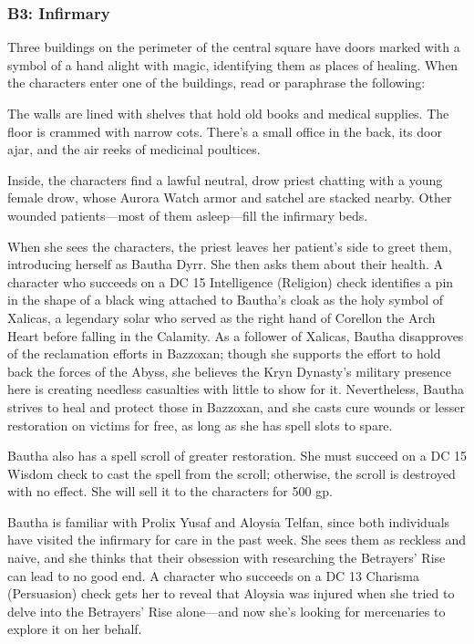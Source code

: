\documentclass[10pt,a4paper,twoside,twocolumn,openany,nodeprecatedcode]{dndbook}
\begin{document}
\subsubsection{B3: Infirmary}
Three buildings on the perimeter of the central square have doors marked with a symbol of a hand alight with magic, identifying them as places of healing. When the characters enter one of the buildings, read or paraphrase the following:

\begin{DndReadAloud}{}
The walls are lined with shelves that hold old books and medical supplies. The floor is crammed with narrow cots. There's a small office in the back, its door ajar, and the air reeks of medicinal poultices.

\end{DndReadAloud}

Inside, the characters find a lawful neutral, drow priest chatting with a young female drow, whose Aurora Watch armor and satchel are stacked nearby. Other wounded patients—most of them asleep—fill the infirmary beds.

When she sees the characters, the priest leaves her patient's side to greet them, introducing herself as Bautha Dyrr. She then asks them about their health. A character who succeeds on a DC 15 Intelligence (Religion) check identifies a pin in the shape of a black wing attached to Bautha's cloak as the holy symbol of Xalicas, a legendary solar who served as the right hand of Corellon the Arch Heart before falling in the Calamity. As a follower of Xalicas, Bautha disapproves of the reclamation efforts in Bazzoxan; though she supports the effort to hold back the forces of the Abyss, she believes the Kryn Dynasty's military presence here is creating needless casualties with little to show for it. Nevertheless, Bautha strives to heal and protect those in Bazzoxan, and she casts cure wounds or lesser restoration on victims for free, as long as she has spell slots to spare.

Bautha also has a spell scroll of greater restoration. She must succeed on a DC 15 Wisdom check to cast the spell from the scroll; otherwise, the scroll is destroyed with no effect. She will sell it to the characters for 500 gp.

Bautha is familiar with Prolix Yusaf and Aloysia Telfan, since both individuals have visited the infirmary for care in the past week. She sees them as reckless and naive, and she thinks that their obsession with researching the Betrayers' Rise can lead to no good end. A character who succeeds on a DC 13 Charisma (Persuasion) check gets her to reveal that Aloysia was injured when she tried to delve into the Betrayers' Rise alone—and now she's looking for mercenaries to explore it on her behalf.
\end{document}
